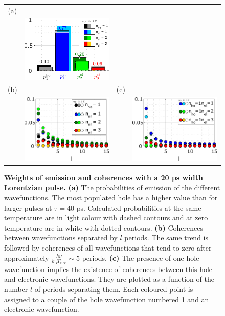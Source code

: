 \begin{figure}[hptb]
	\begin{center}
		\begin{tabular}{c c c c}
			(a) & & &   \\ 
			 & \includegraphics[width = 5cm]{./chap1/JnlData_leviton_20ps_1e_51mK_Projected_Gradient_Method_proba} &
			 &  \\
			 (b) & & (c) & \\
			 & \includegraphics[width = 5cm]{./chap1/JnlData_leviton_20ps_1e_51mK_Projected_Gradient_Method_coh_period} &
			 & \includegraphics[width = 5cm]{./chap1/JnlData_leviton_20ps_1e_51mK_Projected_Gradient_Method_coh_el_ho_0}
		\end{tabular} 
	\end{center}
	\caption{ \textbf{Weights of emission and coherences with a 20 ps width Lorentzian pulse.} \textbf{(a)} The probabilities of emission of the different wavefunctions. The most populated hole has a higher value than for larger pulses at $\tau  = 40$ ps. Calculated probabilities at the same temperature are in light colour with dashed contours and at zero temperature are in white with dotted contours. \textbf{(b)} Coherences between wavefunctions separated by $l$ periods. The same trend is followed by coherences of all wavefunctions that tend to zero after approximately $\frac{h\nu}{k_{\mathrm{B}}T_{\mathrm{elec}}} \sim 5$ periods. \textbf{(c)} The presence of one hole wavefunction implies the existence of coherences between this hole and electronic wavefunctions. They are plotted as a function of the number $l$ of periods separating them. Each coloured point is assigned to a couple of the hole wavefunction numbered 1 and an electronic wavefunction.}
	\label{fig: Jnl du 1e 20ps}
\end{figure}


